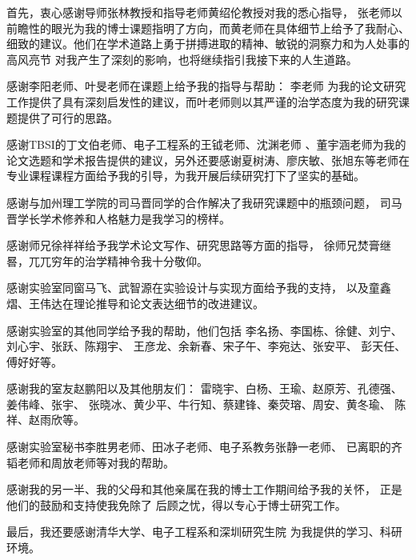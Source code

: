 
\begin{acknowledgements}
  首先，衷心感谢导师张林教授和指导老师黄绍伦教授对我的悉心指导，
  张老师以前瞻性的眼光为我的博士课题指明了方向，而黄老师在具体细节上给予了我耐心、
  细致的建议。他们在学术道路上勇于拼搏进取的精神、敏锐的洞察力和为人处事的高风亮节
  对我产生了深刻的影响，也将继续指引我接下来的人生道路。

  感谢李阳老师、叶旻老师在课题上给予我的指导与帮助：
  李老师 为我的论文研究工作提供了具有深刻启发性的建议，而叶老师则以其严谨的治学态度为我的研究课题提供了可行的思路。

 感谢TBSI的丁文伯老师、电子工程系的王钺老师、沈渊老师 、董宇涵老师为我的论文选题和学术报告提供的建议，另外还要感谢夏树涛、廖庆敏、张旭东等老师在专业课程课程方面给予我的引导，为我开展后续研究打下了坚实的基础。
 
 感谢与加州理工学院的司马晋同学的合作解决了我研究课题中的瓶颈问题，
 司马晋学长学术修养和人格魅力是我学习的榜样。
 
 感谢师兄徐祥祥给予我学术论文写作、研究思路等方面的指导，
 徐师兄焚膏继晷，兀兀穷年的治学精神令我十分敬仰。
 
感谢实验室同窗马飞、武智源在实验设计与实现方面给予我的支持，
以及童鑫熠、王伟达在理论推导和论文表达细节的改进建议。

感谢实验室的其他同学给予我的帮助，他们包括
李名扬、李国栋、徐健、刘宁、刘心宇、张跃、陈翔宇、
王彦龙、余新春、宋子午、李宛达、张安平、
彭天任、傅好好等。

感谢我的室友赵鹏阳以及其他朋友们：
雷晓宇、白杨、王瑜、赵原芳、孔德强、姜伟峰、张宇、
张晓冰、黄少平、牛行知、蔡建锋、秦荧瑢、周安、黄冬瑜、
陈祥、赵雨欣等。

感谢实验室秘书李胜男老师、田冰子老师、电子系教务张静一老师、
已离职的齐韬老师和周放老师等对我的帮助。

感谢我的另一半、我的父母和其他亲属在我的博士工作期间给予我的关怀，
正是他们的鼓励和支持使我免除了
后顾之忧，得以专心于博士研究工作。

最后，我还要感谢清华大学、电子工程系和深圳研究生院
为我提供的学习、科研环境。
\end{acknowledgements}
